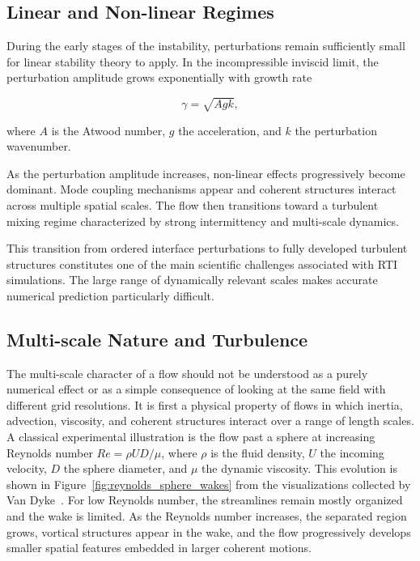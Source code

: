\subsection{Linear and Non-linear Regimes}

During the early stages of the instability, perturbations remain sufficiently small for linear stability theory to apply. In the incompressible inviscid limit, the perturbation amplitude grows exponentially with growth rate~\citep[p.~23]{zhou2017rti1}

\[
\gamma = \sqrt{A g k},
\]

where $A$ is the Atwood number, $g$ the acceleration, and $k$ the perturbation wavenumber.

As the perturbation amplitude increases, non-linear effects progressively become dominant. Mode coupling mechanisms appear and coherent structures interact across multiple spatial scales. The flow then transitions toward a turbulent mixing regime characterized by strong intermittency and multi-scale dynamics.


This transition from ordered interface perturbations to fully developed turbulent structures constitutes one of the main scientific challenges associated with RTI simulations. The large range of dynamically relevant scales makes accurate numerical prediction particularly difficult.

\subsection{Multi-scale Nature and Turbulence}

The multi-scale character of a flow should not be understood as a purely
numerical effect or as a simple consequence of looking at the same field with
different grid resolutions. It is first a physical property of flows in which
inertia, advection, viscosity, and coherent structures interact over a range of
length scales. A classical experimental illustration is the flow past a sphere
at increasing Reynolds number
$Re=\rho U D/\mu$, where $\rho$ is the fluid density, $U$ the incoming velocity,
$D$ the sphere diameter, and $\mu$ the dynamic viscosity. This evolution is
shown in Figure~\ref{fig:reynolds_sphere_wakes} from the visualizations
collected by Van Dyke~\citep{vandDyke1982album}. For low Reynolds number, the
streamlines remain mostly organized and the wake is limited. As the Reynolds
number increases, the separated region grows, vortical structures appear in the
wake, and the flow progressively develops smaller spatial features embedded in
larger coherent motions.

